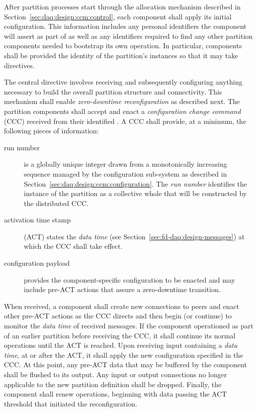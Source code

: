 After partition processes start through the allocation mechanism described in Section~\ref{sec:daq:design:ccm:control}, each component shall apply its initial configuration. 
This information includes any personal identifiers the component will assert as part of  as well as any identifiers required to find any other partition components needed to bootstrap its own operation. 
In particular, components shall be provided the identity of the partition's  instances so that it may take directives.

The central directive involves receiving and subsequently configuring anything necessary to build the overall partition structure and connectivity.  
This mechanism shall enable \textit{zero-downtime reconfiguration} as described next.
The partition components shall accept and enact a \textit{configuration change command} (CCC) received from their identified . 
A CCC shall provide, at a minimum, the following pieces of information:

\begin{description}
\item[run number] is a globally unique integer drawn from a monotonically increasing sequence managed by the  configuration sub-system as described in Section~\ref{sec:daq:design:ccm:configuration}. 
  The \textit{run number} identifies the instance of the partition as a collective whole that will be constructed by the distributed CCC.
\item[activation time stamp] (ACT) states the \textit{data time} (see Section~\ref{sec:fd-daq:design-messages}) at which the CCC shall take effect. 
\item[configuration payload] provides the component-specific configuration to be enacted and may include  pre-ACT actions that assure a zero-downtime transition.
\end{description}

When received, a component  shall create new connections to peers and enact other pre-ACT actions as the CCC directs and then begin (or continue) to monitor the \textit{data time} of received messages. 
If the component operationed as part of an earlier partition before receiving the CCC, it shall continue its normal operations until the ACT is reached. 
Upon receiving input containing a \textit{data time}, at or after the ACT, it shall apply the new configuration specified in the CCC. 
At this point, any pre-ACT data that may be buffered by the component shall be flushed to its output. 
Any input or output connections no longer applicable to the new partition definition shall be dropped. 
Finally, the component shall renew operations, beginning with data passing the ACT threshold that initiated the reconfiguration.

